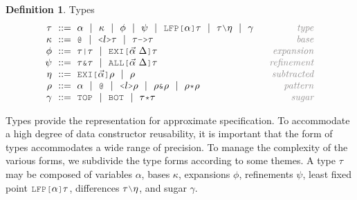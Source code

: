 \documentclass[acmsmall]{acmart}
\theoremstyle{definition}
\newtheorem{definition}{Definition}[section]
\begin{document}
\hfill
\begin{definition} Types 
  \label{def:types}
  \[\begin{array}[t]{r@{}l@{}r}
    \nonterm{\tau} & \is 
    \begin{array}[t]{@{}l}
      \alpha \sep
      \kappa \sep 
      \phi \sep 
      \psi \sep 
      \J{LFP[}\alpha\J{]}\tau \sep
      \tau \typdiff \eta \sep
      \gamma
    \end{array}
    & \com{type}
    \\
    \nonterm{\kappa} & \is 
    \begin{array}[t]{@{}l}
      \J{@} \sep
      \J{<} l \J{>} \tau \sep 
      \tau\J{->}\tau
    \end{array}
    & \com{base}
    \\
    \nonterm{\phi} & \is 
    \begin{array}[t]{@{}l}
      \tau\J{|}\tau \sep 
      \J{EXI[}\vec{\alpha}\ \Delta \J{]} \tau
    \end{array}
    & \com{expansion}
    \\
    \nonterm{\psi} & \is 
    \begin{array}[t]{@{}l}
      \tau\J{\&}\tau \sep 
      \J{ALL[}\vec{\alpha}\ \Delta \J{]} \tau
    \end{array}
    & \com{refinement}
    \\
    \nonterm{\eta} & \is 
    \begin{array}[t]{@{}l}
      \J{EXI[}\vec{\alpha} \J{]} \rho \sep 
      \rho
    \end{array}
    & \com{subtracted}
    \\
    \nonterm{\rho} & \is 
    \begin{array}[t]{@{}l}
      \alpha \sep
      \J{@} \sep
      \J{<}l\J{>}\rho \sep 
      \rho\J{\&}\rho \sep
      \rho\J{*}\rho
    \end{array}
    & \com{pattern}
    \\
    \nonterm{\gamma} & \is 
    \begin{array}[t]{@{}l}
      \J{TOP} \sep \J{BOT} \sep 
      \tau \J{*} \tau 
    \end{array}
    & \com{sugar}
  \end{array}\]
\end{definition}
\hfill

Types provide the representation for approximate specification.
To accommodate a high degree of data constructor reusability,
it is important that the form of types accommodates a wide range of precision.
To manage the complexity of the various forms, we subdivide the type forms
according to some themes.
A type $\tau$ may be composed of variables $\alpha$, 
bases $\kappa$, expansions $\phi$, refinements $\psi$,
least fixed point $\J{LFP[}\alpha \J{]} \tau$,
differences $\tau \typdiff \eta$, and sugar $\gamma$.
\end{document}
